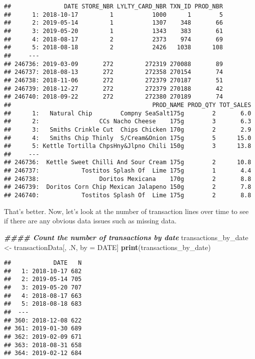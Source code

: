 \documentclass[
]{article}
\newenvironment{Shaded}{\begin{snugshade}}{\end{snugshade}}
\newcommand{\DocumentationTok}[1]{\textcolor[rgb]{0.56,0.35,0.01}{\textbf{\textit{#1}}}}
\newcommand{\FunctionTok}[1]{\textcolor[rgb]{0.13,0.29,0.53}{\textbf{#1}}}
\newcommand{\NormalTok}[1]{#1}
\newcommand{\OtherTok}[1]{\textcolor[rgb]{0.56,0.35,0.01}{#1}}
\begin{document}
\begin{verbatim}
##               DATE STORE_NBR LYLTY_CARD_NBR TXN_ID PROD_NBR
##      1: 2018-10-17         1           1000      1        5
##      2: 2019-05-14         1           1307    348       66
##      3: 2019-05-20         1           1343    383       61
##      4: 2018-08-17         2           2373    974       69
##      5: 2018-08-18         2           2426   1038      108
##     ---                                                    
## 246736: 2019-03-09       272         272319 270088       89
## 246737: 2018-08-13       272         272358 270154       74
## 246738: 2018-11-06       272         272379 270187       51
## 246739: 2018-12-27       272         272379 270188       42
## 246740: 2018-09-22       272         272380 270189       74
##                                        PROD_NAME PROD_QTY TOT_SALES
##      1:   Natural Chip        Compny SeaSalt175g        2       6.0
##      2:                 CCs Nacho Cheese    175g        3       6.3
##      3:   Smiths Crinkle Cut  Chips Chicken 170g        2       2.9
##      4:   Smiths Chip Thinly  S/Cream&Onion 175g        5      15.0
##      5: Kettle Tortilla ChpsHny&Jlpno Chili 150g        3      13.8
##     ---                                                            
## 246736:  Kettle Sweet Chilli And Sour Cream 175g        2      10.8
## 246737:            Tostitos Splash Of  Lime 175g        1       4.4
## 246738:                 Doritos Mexicana    170g        2       8.8
## 246739:  Doritos Corn Chip Mexican Jalapeno 150g        2       7.8
## 246740:            Tostitos Splash Of  Lime 175g        2       8.8
\end{verbatim}

That's better. Now, let's look at the number of transaction lines over
time to see if there are any obvious data issues such as missing data.

\begin{Shaded}
\begin{Highlighting}[]
\DocumentationTok{\#\#\#\# Count the number of transactions by date}
\NormalTok{transactions\_by\_date }\OtherTok{\textless{}{-}}\NormalTok{ transactionData[, .N, by }\OtherTok{=}\NormalTok{ DATE]}
\FunctionTok{print}\NormalTok{(transactions\_by\_date)}
\end{Highlighting}
\end{Shaded}

\begin{verbatim}
##            DATE   N
##   1: 2018-10-17 682
##   2: 2019-05-14 705
##   3: 2019-05-20 707
##   4: 2018-08-17 663
##   5: 2018-08-18 683
##  ---               
## 360: 2018-12-08 622
## 361: 2019-01-30 689
## 362: 2019-02-09 671
## 363: 2018-08-31 658
## 364: 2019-02-12 684
\end{verbatim}
\end{document}
